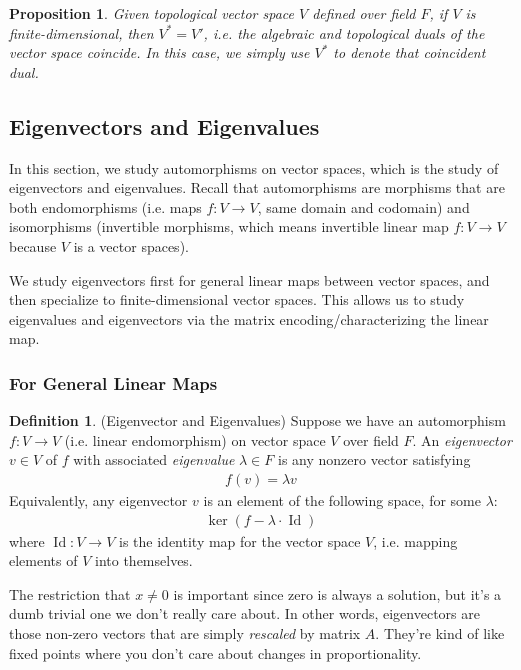 \documentclass[12pt]{book}
\numberwithin{equation}{section} %
\theoremstyle{plain}
\newtheorem{prop}[thm]{Proposition}
\theoremstyle{definition}
\newtheorem{defn}[thm]{Definition}
\theoremstyle{remark}
\newcommand{\ra}{\rightarrow}
\begin{document}
\begin{prop}
Given topological vector space $V$ defined over field $F$,
if $V$ is finite-dimensional, then $V^*=V'$, i.e. the algebraic and
topological duals of the vector space coincide.
In this case, we simply use $V^*$ to denote that coincident dual.
\end{prop}



\clearpage
\subsection{Eigenvectors and Eigenvalues}

In this section, we study automorphisms on vector spaces, which is the
study of eigenvectors and eigenvalues.
Recall that automorphisms are morphisms that are both endomorphisms
(i.e. maps $f:V\ra V$, same domain and codomain) and
isomorphisms (invertible morphisms, which means invertible linear map
$f:V\ra V$ because $V$ is a vector spaces).

We study eigenvectors first for general linear maps between vector
spaces, and then specialize to finite-dimensional vector spaces.
This allows us to study eigenvalues and eigenvectors via the matrix
encoding/characterizing the linear map.

\subsubsection{For General Linear Maps}


\begin{defn}({Eigenvector and Eigenvalues})
Suppose we have an automorphism $f:V\ra V$ (i.e. linear endomorphism) on
vector space $V$ over field $F$.
An \emph{eigenvector} $v\in V$ of $f$ with associated
\emph{eigenvalue} $\lambda\in F$ is any nonzero vector satisfying
\begin{align*}
  f(v) = \lambda v
\end{align*}
Equivalently, any eigenvector $v$ is an element of the following space,
for some $\lambda$:
\begin{align*}
  \operatorname{ker}(f-\lambda \cdot \operatorname{Id})
\end{align*}
where $\operatorname{Id}:V\ra V$ is the identity map for the vector
space $V$, i.e. mapping elements of $V$ into themselves.

The restriction that $x\neq 0$ is important since zero is always a
solution, but it's a dumb trivial one we don't really care about.  In
other words, eigenvectors are those non-zero vectors that are simply
\emph{rescaled} by matrix $A$. They're kind of like fixed points where
you don't care about changes in proportionality.
\end{defn}
\end{document}

